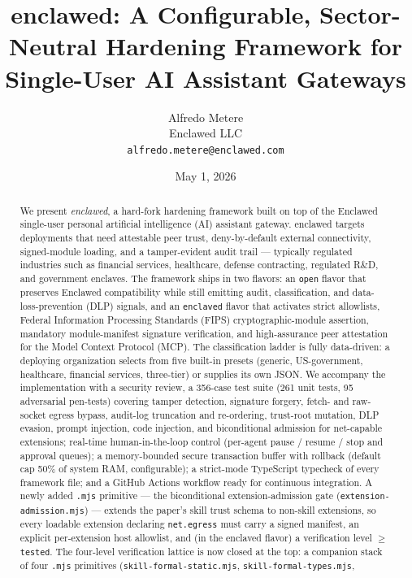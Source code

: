 \documentclass[11pt]{article}
\title{
  \textbf{enclawed}: A Configurable, Sector-Neutral Hardening Framework for
  Single-User AI Assistant Gateways
}
\author{%
  Alfredo Metere\\
  Enclawed LLC\\
  \texttt{alfredo.metere@enclawed.com}
}
\date{May 1, 2026}
\begin{document}
\maketitle

\begin{abstract}
We present \emph{enclawed}, a hard-fork hardening framework built on top of
the Enclawed single-user personal artificial intelligence (AI) assistant
gateway. enclawed targets deployments that need attestable peer trust,
deny-by-default external connectivity, signed-module loading, and a
tamper-evident audit trail --- typically regulated industries such as
financial services, healthcare, defense contracting, regulated R\&D, and
government enclaves. The framework ships in two flavors: an \texttt{open}
flavor that preserves Enclawed compatibility while still emitting audit,
classification, and data-loss-prevention (DLP) signals, and an
\texttt{enclaved} flavor that activates strict allowlists, Federal
Information Processing Standards (FIPS) cryptographic-module assertion,
mandatory module-manifest signature verification, and high-assurance
peer attestation for the Model Context Protocol (MCP). The classification ladder is fully data-driven: a deploying
organization selects from five built-in presets (generic, US-government,
healthcare, financial services, three-tier) or supplies its own JSON. We
accompany the implementation with a security review, a 356-case test
suite (261 unit tests, 95 adversarial pen-tests) covering tamper
detection, signature forgery, fetch- and raw-socket egress bypass,
audit-log truncation and re-ordering, trust-root mutation, DLP evasion,
prompt injection, code injection, and biconditional admission for
net-capable extensions; real-time human-in-the-loop control (per-agent
pause / resume / stop and approval queues); a memory-bounded secure
transaction buffer with rollback (default cap 50\% of system RAM,
configurable); a strict-mode TypeScript typecheck of every framework
file; and a GitHub Actions workflow ready for continuous integration.
A newly added \texttt{.mjs} primitive --- the biconditional
extension-admission gate (\texttt{extension-admission.mjs}) ---
extends the paper's skill trust schema to non-skill extensions, so
every loadable extension declaring \texttt{net.egress} must carry a
signed manifest, an explicit per-extension host allowlist, and (in the
enclaved flavor) a verification level $\geq$ \texttt{tested}.
The four-level verification lattice is now closed at the top: a
companion stack of four \texttt{.mjs} primitives
(\texttt{skill-formal-static.mjs}, \texttt{skill-formal-types.mjs},

\end{abstract}
\end{document}
